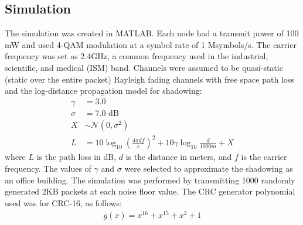 \subsection{Simulation}
The simulation was created in MATLAB.  Each node had a transmit power of 100 mW and used 4-QAM modulation at a symbol rate of 1 Msymbols/s.  The carrier frequency was set as 2.4GHz, a common frequency used in the industrial, scientific, and medical (ISM) band.  Channels were assumed to be quasi-static (static over the entire packet) Rayleigh fading channels with free space path loss and the log-distance propagation model for shadowing:
\begin{align*}
\gamma &= 3.0\\
\sigma &= 7.0 \mbox{ dB}\\
X &\sim \mathcal{N}(0,\sigma^2)\\
L &= 10\log_{10}\left(\frac{4\pi d f}{c}\right)^2 + 10\gamma \log_{10} \frac{d}{1000m} + X
\end{align*}
where $L$ is the path loss in dB, $d$ is the distance in meters, and $f$ is the carrier frequency.
The values of $\gamma$ and $\sigma$ were selected to approximate the shadowing as an office building.
The simulation was performed by transmitting 1000 randomly generated 2KB packets at each noise floor value.
The CRC generator polynomial used was for CRC-16, as follows:
\begin{align*}
g(x) = x^{16} + x^{15} + x^{2} + 1
\end{align*}




